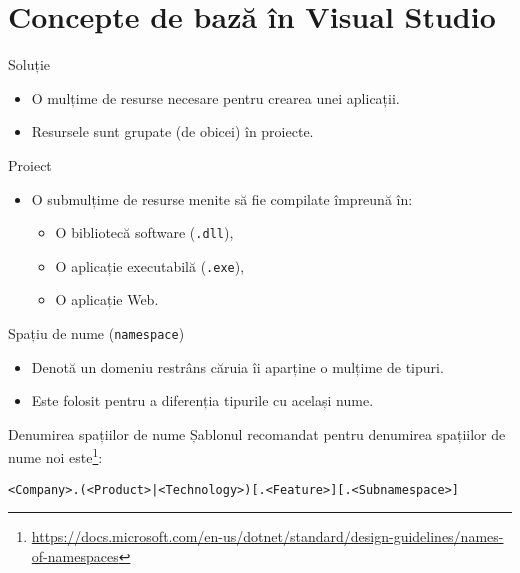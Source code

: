 \documentclass[presentation]{beamer}
\begin{document}
\section{Concepte de bază în Visual Studio}
\label{sec:org61661c9}
\begin{frame}[label={sec:org120f5b3}]{Soluție}
\begin{itemize}
\item O mulțime de resurse necesare pentru crearea unei aplicații.
\item Resursele sunt grupate (de obicei) în proiecte.
\end{itemize}
\end{frame}
\begin{frame}[label={sec:orga97867a},fragile]{Proiect}
 \begin{itemize}
\item O submulțime de resurse menite să fie compilate împreună în:
\begin{itemize}
\item O bibliotecă software (\texttt{.dll}),
\item O aplicație executabilă (\texttt{.exe}),
\item O aplicație Web.
\end{itemize}
\end{itemize}
\end{frame}
\begin{frame}[label={sec:org21b3d10},fragile]{Spațiu de nume (\texttt{namespace})}
 \begin{itemize}
\item Denotă un domeniu restrâns căruia îi aparține o mulțime de tipuri.
\item Este folosit pentru a diferenția tipurile cu același nume.
\end{itemize}
\end{frame}
\begin{frame}[label={sec:org5a00851},fragile]{Denumirea spațiilor de nume}
 Șablonul recomandat pentru denumirea spațiilor de nume noi este\footnote{\url{https://docs.microsoft.com/en-us/dotnet/standard/design-guidelines/names-of-namespaces}}:
\begin{verbatim}
<Company>.(<Product>|<Technology>)[.<Feature>][.<Subnamespace>]
\end{verbatim}
\end{frame}
\end{document}

